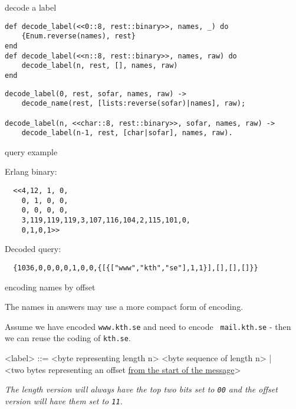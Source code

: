 \begin{frame}[fragile]{decode a label}

\begin{verbatim}
def decode_label(<<0::8, rest::binary>>, names, _) do
    {Enum.reverse(names), rest}
end
def decode_label(<<n::8, rest::binary>>, names, raw) do
    decode_label(n, rest, [], names, raw)
end
\end{verbatim}

\vspace{20pt}\pause

\begin{verbatim}
decode_label(0, rest, sofar, names, raw) ->
    decode_name(rest, [lists:reverse(sofar)|names], raw);

decode_label(n, <<char::8, rest::binary>>, sofar, names, raw) ->
    decode_label(n-1, rest, [char|sofar], names, raw).
\end{verbatim}

\end{frame}

\begin{frame}[fragile]{query example}

  Erlang binary:
\begin{verbatim}
  <<4,12, 1, 0,
    0, 1, 0, 0,
    0, 0, 0, 0,
    3,119,119,119,3,107,116,104,2,115,101,0,
    0,1,0,1>>
\end{verbatim}

\vspace{20pt} \pause
  Decoded query:
\begin{verbatim}
  {1036,0,0,0,0,1,0,0,{[{["www","kth","se"],1,1}],[],[],[]}}
\end{verbatim}  

\end{frame}

\begin{frame}{encoding names by offset}

The names in answers may use a more compact form of encoding.  

\vspace{20pt}\pause

Assume we have encoded {\tt www.kth.se} and need to encode {\tt
  mail.kth.se} - then we can reuse the coding of {\tt kth.se}.

\vspace{20pt} \pause

\begin{grammar}
<label> ::=  <byte representing length n> <byte sequence of length n> | \\
             <two bytes representing an offset \underline{ from the start of the message}>
\end{grammar}


\vspace{20pt} \pause


{\em The length version will always have the top two bits set to {\tt 00} and the offset version will have them set to {\tt 11}.}

\end{frame}

